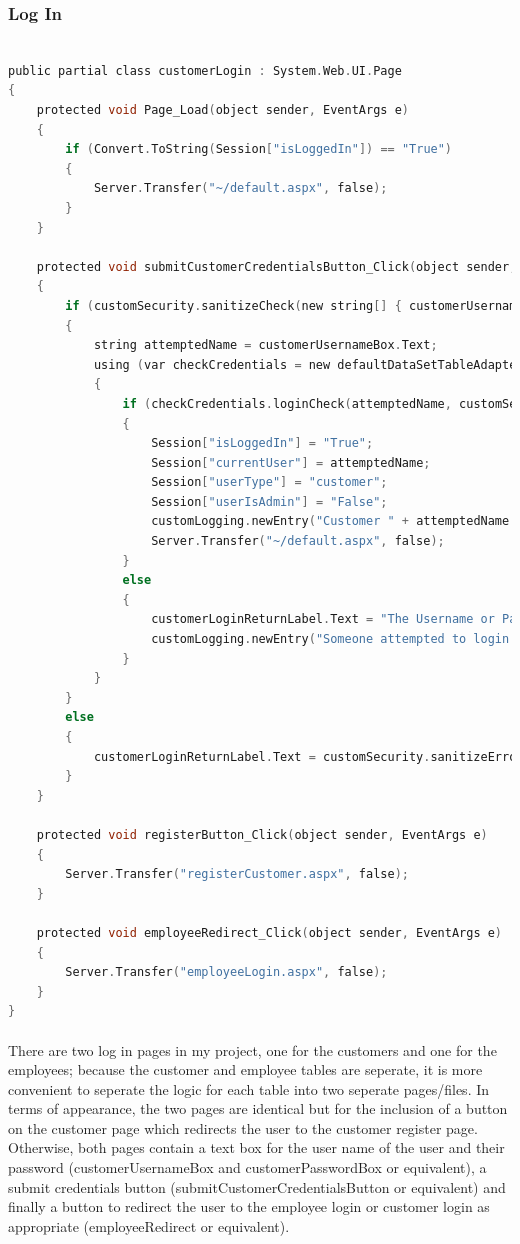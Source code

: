 ﻿\documentclass{article}
\begin{document}
    \subsubsection{Log In}
    \begin{lstlisting}[language=C]

public partial class customerLogin : System.Web.UI.Page
{
    protected void Page_Load(object sender, EventArgs e)
    {
        if (Convert.ToString(Session["isLoggedIn"]) == "True")
        {
            Server.Transfer("~/default.aspx", false);
        }
    }

    protected void submitCustomerCredentialsButton_Click(object sender, EventArgs e)
    {
        if (customSecurity.sanitizeCheck(new string[] { customerUsernameBox.Text, customerPasswordBox.Text }))
        {
            string attemptedName = customerUsernameBox.Text;
            using (var checkCredentials = new defaultDataSetTableAdapters.customersTableAdapter())
            {
                if (checkCredentials.loginCheck(attemptedName, customSecurity.generateMD5(customerPasswordBox.Text)) != null)
                {
                    Session["isLoggedIn"] = "True";
                    Session["currentUser"] = attemptedName;
                    Session["userType"] = "customer";
                    Session["userIsAdmin"] = "False";
                    customLogging.newEntry("Customer " + attemptedName + " logged in");
                    Server.Transfer("~/default.aspx", false);
                }
                else
                {
                    customerLoginReturnLabel.Text = "The Username or Password is incorrect.";
                    customLogging.newEntry("Someone attempted to login as a customer with username '" + attemptedName + "' but the credentials were incorrect");
                }
            }
        }
        else
        {
            customerLoginReturnLabel.Text = customSecurity.sanitizeErrorMessage;
        }
    }

    protected void registerButton_Click(object sender, EventArgs e)
    {
        Server.Transfer("registerCustomer.aspx", false);
    }

    protected void employeeRedirect_Click(object sender, EventArgs e)
    {
        Server.Transfer("employeeLogin.aspx", false);
    }
}
    \end{lstlisting}
    \paragraph{}There are two log in pages in my project, one for the customers and one for the employees; because the customer and employee tables are seperate, it is more convenient to seperate the logic for each table into two seperate pages/files.
    In terms of appearance, the two pages are identical but for the inclusion of a button on the customer page which redirects the user to the customer register page.
    Otherwise, both pages contain a text box for the user name of the user and their password (customerUsernameBox and customerPasswordBox or equivalent), a submit credentials button (submitCustomerCredentialsButton or equivalent) and finally a button to redirect the user to the employee login or customer login as appropriate (employeeRedirect or equivalent).
\end{document}
